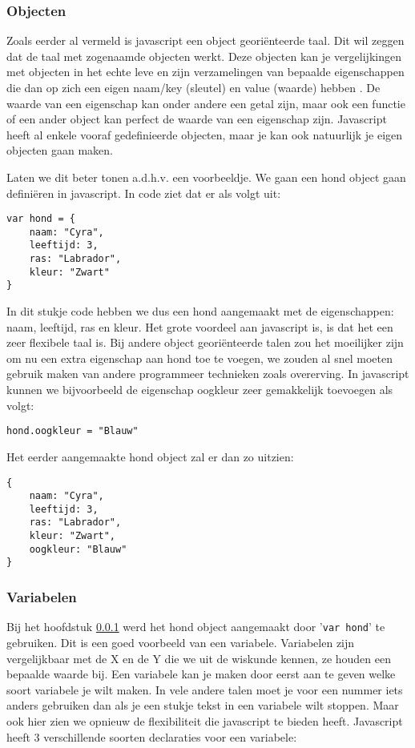 \subsubsection{Objecten}
\label{sssec:objecten}
Zoals eerder al vermeld is javascript een object georiënteerde taal. Dit wil zeggen dat de taal met zogenaamde objecten werkt. Deze objecten kan je vergelijkingen met objecten in het echte leve en zijn verzamelingen van bepaalde eigenschappen die dan op zich een eigen naam/key (sleutel) en value (waarde) hebben \autocite{Mozilla2018}. De waarde van een eigenschap kan onder andere een getal zijn, maar ook een functie of een ander object kan perfect de waarde van een eigenschap zijn. Javascript heeft al enkele vooraf gedefinieerde objecten, maar je kan ook natuurlijk je eigen objecten gaan maken.

Laten we dit beter tonen a.d.h.v. een voorbeeldje. We gaan een hond object gaan definiëren in javascript. In code ziet dat er als volgt uit:

\begin{lstlisting}[frame=single, caption=Hond object aanmaken]
var hond = {
	naam: "Cyra",
	leeftijd: 3,
	ras: "Labrador",
	kleur: "Zwart"
}
\end{lstlisting}

In dit stukje code hebben we dus een hond aangemaakt met de eigenschappen: naam, leeftijd, ras en kleur. Het grote voordeel aan javascript is, is dat het een zeer flexibele taal is. Bij andere object georiënteerde talen zou het moeilijker zijn om nu een extra eigenschap aan hond toe te voegen, we zouden al snel moeten gebruik maken van andere programmeer technieken zoals overerving. In javascript kunnen we bijvoorbeeld de eigenschap oogkleur zeer gemakkelijk toevoegen als volgt:

\begin{lstlisting}[frame=single, caption=Eigenschap toevoegen aan en object]
hond.oogkleur = "Blauw"
\end{lstlisting}

Het eerder aangemaakte hond object zal er dan zo uitzien:

\begin{lstlisting}[frame=single, caption=Het nieuwe hond object]
{
	naam: "Cyra",
 	leeftijd: 3,
 	ras: "Labrador",
 	kleur: "Zwart",
 	oogkleur: "Blauw"
}
\end{lstlisting}

\subsubsection{Variabelen}
\label{sssec:variabelen}
Bij het hoofdstuk \ref{sssec:objecten} werd het hond object aangemaakt door '\lstinline[basicstyle=\ttfamily\color{red}]|var hond|' te gebruiken. Dit is een goed voorbeeld van een variabele. Variabelen zijn vergelijkbaar met de X en de Y die we uit de wiskunde kennen, ze houden een bepaalde waarde bij. Een variabele kan je maken door eerst aan te geven welke soort variabele je wilt maken. In vele andere talen moet je voor een nummer iets anders gebruiken dan als je een stukje tekst in een variabele wilt stoppen. Maar ook hier zien we opnieuw de flexibiliteit die javascript te bieden heeft. Javascript heeft 3 verschillende soorten declaraties voor een variabele:

